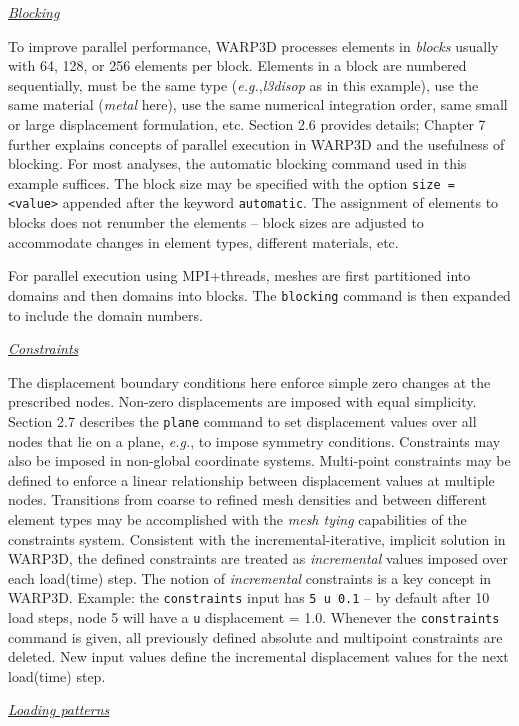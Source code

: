 \documentclass[11pt]{report}
\numberwithin{equation}{section}
\newcommand{\ttt} {\texttt}  %
\newcommand{\ul} {\underline}
\newcommand{\eg}{\emph{e.g.},\xspace}
\newcommand{\ti}{\emph}
\newcommand{\nid}{\noindent}
\begin{document}
{\nid \ti{\ul{Blocking} }

\nid To improve parallel performance, WARP3D processes elements in \ti{blocks} usually with 64, 128, or
256 elements per block. Elements in a block are numbered sequentially, must be the same type
(\eg \ti{l3disop} as in this example), use the same material (\ti{metal} here), use the same
numerical integration order, same small or large displacement formulation, etc.
Section 2.6 provides details; Chapter 7 further explains concepts of parallel
execution in WARP3D and the usefulness of blocking. For most analyses, the automatic blocking
command used in this example suffices. The block size may be specified with the 
option \ttt{size = <value>} appended after the keyword \ttt{automatic}. The assignment of elements to 
blocks does not renumber the elements -- block sizes are adjusted to accommodate changes in element types, 
different materials, etc.

For parallel execution using MPI+threads, meshes are first partitioned into domains and then domains into blocks.
The \ttt{blocking} command is then expanded to include the domain numbers.

\nid \ti{\ul{Constraints} }

\nid The displacement boundary conditions here enforce simple zero changes at the prescribed nodes.
Non-zero displacements are imposed with equal simplicity.  Section 2.7
describes the \ttt{plane} command to set displacement values over all nodes that lie  on a plane, \eg to impose
symmetry conditions. Constraints may also be imposed in non-global coordinate systems. Multi-point
constraints may be defined to enforce a linear relationship between displacement values at multiple nodes. 
Transitions from coarse to refined mesh densities and between different element types may be accomplished
with the \ti{mesh tying} capabilities of the constraints system. Consistent with the incremental-iterative, implicit
solution in WARP3D, the defined constraints are treated as \ti{incremental} values imposed over each
load(time) step. The notion of \ti{incremental} constraints is a key concept in WARP3D. Example: the \ttt{constraints}
input has \ttt{5 u 0.1} -- by default after 10 load steps, node 5 will have a \ttt{u} displacement = 1.0. Whenever the \ttt{constraints}
command is given, all previously defined absolute and multipoint constraints are deleted. New input values
define the incremental displacement values for the next load(time) step. 

\nid \ti{\ul{Loading patterns} }

}
\end{document}
